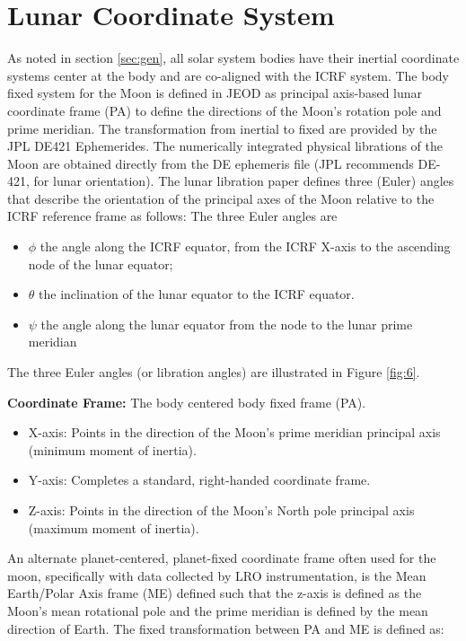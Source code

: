 
\section{Lunar Coordinate System} \label{sec:lunar} 
As noted in section \ref{sec:gen}, all solar system bodies have their inertial coordinate systems center at the body and are co-aligned with the ICRF system. The body fixed system for the Moon is defined in JEOD as principal axis-based lunar coordinate frame (PA) to define the directions of the Moon's rotation pole and prime meridian. The transformation from inertial to fixed are provided by the JPL DE421 Ephemerides. 
The numerically integrated physical librations of the Moon are obtained directly from the DE ephemeris file (JPL recommends DE-421, for lunar orientation). The lunar libration paper \cite{LL} defines three (Euler) angles that describe the orientation of the principal axes of the Moon relative to the ICRF reference frame as follows:   
The three Euler angles are
\begin{itemize}
 \item $\phi$ the angle along the ICRF equator, from the ICRF X-axis to the ascending node of the lunar equator; 
 \item $\theta$ the inclination of the lunar equator to the ICRF equator.
 \item $\psi$ the angle along the lunar equator from the node to the lunar prime meridian
 \end{itemize}
The three Euler angles (or libration angles) are illustrated in Figure \ref{fig:6}.

\textbf{Coordinate Frame: } The body centered body fixed frame (PA).

\begin{itemize}
\item X-axis: Points in the direction of the Moon's prime meridian principal axis (minimum moment of inertia).
\item Y-axis: Completes a standard, right-handed coordinate frame.
\item Z-axis: Points in the direction of the Moon's North pole principal axis (maximum moment of inertia).
\end{itemize}

An alternate planet-centered, planet-fixed coordinate frame often used for the moon, specifically with data collected by LRO instrumentation, is the Mean Earth/Polar Axis frame (ME) defined such that the z-axis is defined as the Moon's mean rotational pole and the prime meridian is defined by the mean direction of Earth. The fixed transformation between PA and ME is defined as:

